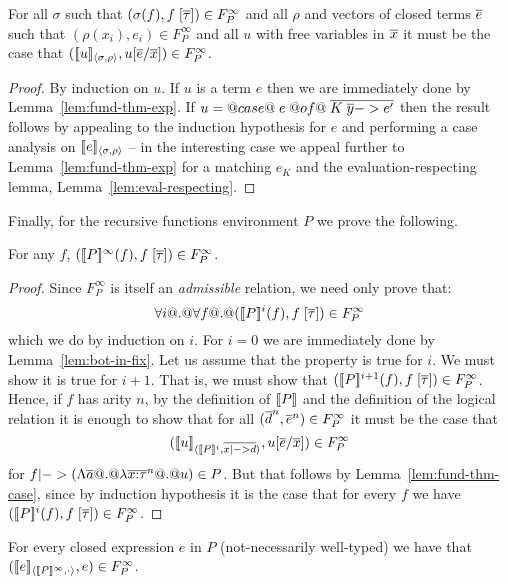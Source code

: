 \documentclass[preprint,nocopyrightspace]{sigplanconf}
\begin{document}
\begin{lemma}\label{lem:fund-thm-case}
For all $\sigma$ such that $(\sigma(f),f\;[\overline{\tau}]) \in F_P^\infty$ and 
all $\rho$ and vectors of closed terms $\overline{e}$ such that $(\rho(x_i),e_i) \in F_P^\infty$ 
and all $u$ with free variables in $\overline{x}$ it must be the case 
that $([\![u]\!]_{\langle {\sigma},{\rho}\rangle},u[\overline{e}/\overline{x}]) \in F_P^\infty$.
\end{lemma}
\begin{proof} By induction on $u$. If $u$ is a term $e$ then we are immediately done
by Lemma~\ref{lem:fund-thm-exp}. If $u = @case@\;e\;@of@\;\overline{K\;\overline{y} -> e'}$ then the 
result follows by appealing to the induction hypothesis for $e$ and performing a case 
analysis on $[\![e]\!]_{\langle {\sigma},{\rho}\rangle}$ -- in the interesting case we appeal further to
Lemma~\ref{lem:fund-thm-exp} for a matching $e_K$ and the evaluation-respecting lemma, 
Lemma~\ref{lem:eval-respecting}.
\end{proof}

Finally, for the recursive functions environment $P$ we prove the following.
\begin{lemma} For any $f$, $([\![P]\!]^\infty(f),f\;[\overline{\tau}]) \in F_P^\infty$. \end{lemma}
\begin{proof}
Since $F_P^\infty$ is itself an {\em admissible} relation, we need only prove that:
\[ \forall i @.@ \forall f @.@ ([\![P]\!]^i(f),f\;[\overline{\tau}]) \in F_P^\infty \] 
which we do by induction on $i$. For $i = 0$ we are immediately done by Lemma~\ref{lem:bot-in-fix}.
Let us assume that the property is true for $i$. We must show it is true for $i+1$. That is, 
we must show that $([\![P]\!]^{i+1}(f),f\;[\overline{\tau}]) \in F_P^\infty$. Hence, if $f$ has arity $n$, by
the definition of $[\![P]\!]$ and the definition of the logical relation it is enough to show that
for all $(\overline{d}^{n},\overline{e}^{n}) \in F_P^\infty$ it must be the case that 
\[    ([\![u]\!]_{\langle {[\![P]\!]^i},{\overline{x |-> d}}\rangle}, u[\overline{e}/\overline{x}]) \in F_P^\infty \] 
for $f |-> (\Lambda\overline{a} @.@ \lambda\overline{x{:}\tau}^{n} @.@ u) \in P$. But that follows by 
Lemma~\ref{lem:fund-thm-case}, since by induction hypothesis it is the case that for 
every $f$ we have $([\![P]\!]^i(f),f\;[\overline{\tau}]) \in F_P^\infty$.
\end{proof} 

\begin{corollary}\label{cor:fund-thm-top}
For every closed expression $e$ in $P$ (not-necessarily well-typed) we have that 
$([\![e]\!]_{\langle {[\![P]\!]^\infty},{\cdot}\rangle}, e) \in F_P^\infty$. 
\end{corollary}
\end{document}
